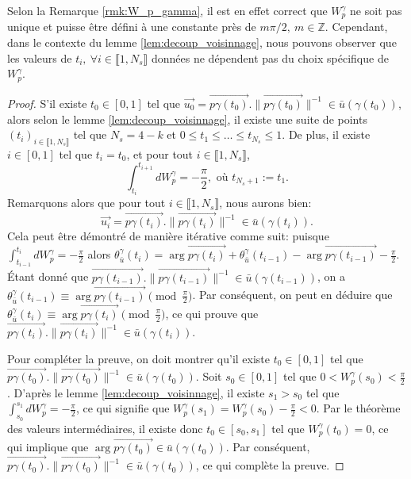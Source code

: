 Selon la Remarque \ref{rmk:W_p_gamma}, il est en effet correct que $W_p^\gamma$ ne soit pas unique et puisse être défini à une constante près de $m\pi/2,~m\in\mathbb{Z}$. Cependant, dans le contexte du lemme \ref{lem:decoup_voisinnage}, nous pouvons observer que les valeurs de $t_i,~\forall i\in\llbracket 1, N_s\rrbracket$ données ne dépendent pas du choix spécifique de $W_p^\gamma$.

\begin{proof}
S'il existe $t_0\in[0, 1]$ tel que $\overrightarrow{u_0}=\overrightarrow{p\gamma(t_0)}.\|\overrightarrow{p\gamma(t_0)}\|^{-1}\in\bar{u}(\gamma(t_0))$, alors selon le lemme \ref{lem:decoup_voisinnage}, il existe une suite de points $(t_i)_{i\in\llbracket1, N_s\rrbracket}$ tel que $N_s=4-k$ et $0\leq t_1\leq\dots\leq t_{N_s}\leq 1$. De plus, il existe $i\in [0, 1]$ tel que $t_i=t_0$, et pour tout $i\in\llbracket 1, N_s\rrbracket$,
$$\int_{t_i}^{t_{i+1}}dW_p^\gamma=-\frac{\pi}{2},\mbox{ où }t_{N_s+1}:=t_1.$$
Remarquons alors que pour tout $i\in\llbracket 1, N_s\rrbracket$, nous aurons bien:$$\overrightarrow{u_i}=\overrightarrow{p\gamma(t_i)}.\|\overrightarrow{p\gamma(t_i)}\|^{-1}\in\bar{u}(\gamma(t_i)).$$
Cela peut être démontré de manière itérative comme suit: puisque $\int_{t_{i-1}}^{t_{i}}dW_p^\gamma=-\frac{\pi}{2}$ alors $\theta^\gamma_{\bar{u}}(t_i)=\arg \overrightarrow{p\gamma(t_i)} +\theta^\gamma_{\bar{u}}(t_{i-1})-\arg \overrightarrow{p\gamma(t_{i-1})}-\frac{\pi}{2}$. Étant donné que $\overrightarrow{p\gamma(t_{i-1})}.\|\overrightarrow{p\gamma(t_{i-1})}\|^{-1}\in\bar{u}(\gamma(t_{i-1}))$, on a $\theta^\gamma_{\bar{u}}(t_{i-1})\equiv\arg \overrightarrow{p\gamma(t_{i-1})}\pmod{\frac{\pi}{2}}$. Par conséquent, on peut en déduire que $\theta^\gamma_{\bar{u}}(t_{i})\equiv\arg \overrightarrow{p\gamma(t_i)}\pmod{\frac{\pi}{2}}$, ce qui prouve que $\overrightarrow{p\gamma(t_i)}.\|\overrightarrow{p\gamma(t_i)}\|^{-1}\in\bar{u}(\gamma(t_i))$.

Pour compléter la preuve, on doit montrer qu'il existe $t_0\in[0,1]$ tel que $\overrightarrow{p\gamma(t_0)}.\|\overrightarrow{p\gamma(t_0)}\|^{-1}\in\bar{u}(\gamma(t_0))$. Soit $s_0\in[0,1]$ tel que $0<W_p^\gamma(s_0)<\frac{\pi}{2}$. D'après le lemme \ref{lem:decoup_voisinnage}, il existe $s_1>s_0$ tel que $\int_{s_0}^{s_1}dW_p^\gamma=-\frac{\pi}{2}$, ce qui signifie que $W_p^\gamma(s_1)=W_p^\gamma(s_0)-\frac{\pi}{2}<0$. Par le théorème des valeurs intermédiaires, il existe donc $t_0\in[s_0, s_1]$ tel que $W_p^\gamma(t_0)=0$, ce qui implique que $\arg\overrightarrow{p\gamma(t_0)}\in\bar{u}(\gamma(t_0))$. Par conséquent, $\overrightarrow{p\gamma(t_0)}.\|\overrightarrow{p\gamma(t_0)}\|^{-1}\in\bar{u}(\gamma(t_0))$, ce qui complète la preuve.
\end{proof}

